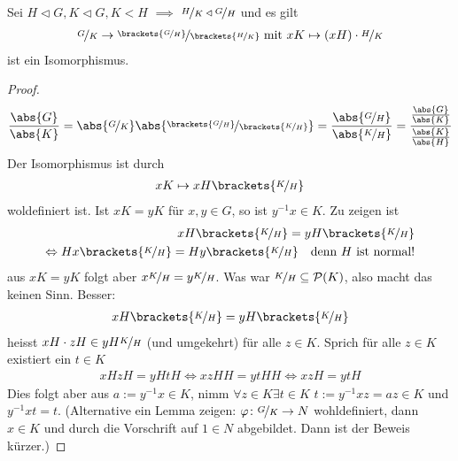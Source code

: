\begin{proposition}[3. Isomorphiesatz]
	Sei $H \lhd G, K \lhd G, K < H$ $\implies$ $\lnkset{H}{K} \lhd \lnkset{G}{H}$ und es gilt
	\begin{align*}
		\lnkset{G}{K} \to \lnkset{\brackets{\lnkset{G}{H}}}{\brackets{\lnkset{H}{K}}} \mit xK \mapsto (xH)\cdot \lnkset{H}{K}
	\end{align*}
	ist ein Isomorphismus.
\end{proposition}
\begin{proof}
	\begin{align*}
		\frac{\abs{G}}{\abs{K}} = \abs{\lnkset{G}{K}} \abs{\lnkset{\brackets{\lnkset{G}{H}}}{\brackets{\lnkset{K}{H}}}} = \frac{\abs{\lnkset{G}{H}}}{\abs{\lnkset{K}{H}}} =  \frac{\frac{\abs{G}}{\abs{K}}}{\frac{\abs{K}}{\abs{H}}}
	\end{align*}
	Der Isomorphismus ist durch
	\begin{align*}
		xK \mapsto xH \brackets{\lnkset{K}{H}}
	\end{align*}
	woldefiniert ist. Ist $xK=yK$ für $x,y \in G$, so ist $y^{-1}x \in K$. Zu zeigen ist
	\begin{align*}
		xH\brackets{\lnkset{K}{H}} = yH\brackets{\lnkset{K}{H}}\\
		\Leftrightarrow Hx\brackets{\lnkset{K}{H}} = Hy\brackets{\lnkset{K}{H}} \quad\text{denn $H$ ist normal!}
	\end{align*}
	aus $xK=yK$ folgt aber $x \lnkset{K}{H} = y\lnkset{K}{H}$. Was war $\lnkset{K}{H} \subseteq \powerset(K)$, also macht das keinen Sinn. Besser: 
	\begin{align*}
		xH\brackets{\lnkset{K}{H}} = yH\brackets{\lnkset{K}{H}}
	\end{align*}
	heisst $xH \cdot zH \in yH\lnkset{K}{H}$ (und umgekehrt) für alle $z \in K$. Sprich für alle $z \in K$ existiert ein $t \in K$
	\begin{align*}
		xHzH = yHtH \Leftrightarrow xzHH = ytHH \Leftrightarrow xzH = ytH
	\end{align*}
	Dies folgt aber aus $a:= y^{-1}x \in K$, nimm $\forall z \in K \exists t \in K$ $t:= y^{-1}xz = az \in K$ und $y^{-1}xt = t$. (Alternative ein Lemma zeigen: $\phi\colon \lnkset{G}{K} \to N$ wohldefiniert, dann $x \in K$ und durch die Vorschrift auf $1 \in N$ abgebildet. Dann ist der Beweis kürzer.)
\end{proof}
